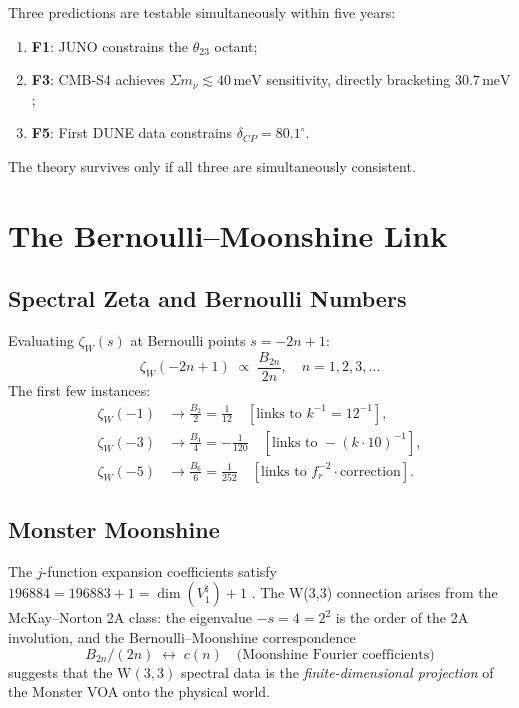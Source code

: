 \documentclass[12pt,a4paper]{article}
\newcommand{\W}{\mathrm{W}(3,3)}
\newcommand{\fr}{f_{\!r}}
\newcommand{\zetaW}{\zeta_{\!W}}
\newcommand{\sumnu}{\Sigma m_\nu}
\newcommand{\thetaTT}{\theta_{23}}
\newcommand{\deltaCP}{\delta_{\!CP}}
\begin{document}
Three predictions are testable simultaneously within five years:
\begin{enumerate}
  \item \textbf{F1}: JUNO constrains the $\thetaTT$ octant;
  \item \textbf{F3}: CMB-S4 achieves $\sumnu\lesssim 40\,\mathrm{meV}$
        sensitivity, directly bracketing $30.7\,\mathrm{meV}$;
  \item \textbf{F5}: First DUNE data constrains $\deltaCP = 80.1^\circ$.
\end{enumerate}
The theory survives only if all three are simultaneously consistent.

\section{The Bernoulli--Moonshine Link}
\label{sec:moonshine}

\subsection{Spectral Zeta and Bernoulli Numbers}

Evaluating $\zetaW(s)$ at Bernoulli points $s = -2n+1$:
\[
  \zetaW(-2n+1) \;\propto\; \frac{B_{2n}}{2n}, \quad n = 1,2,3,\ldots
\]
The first few instances:
\begin{align}
  \zetaW(-1) &\to \tfrac{B_2}{2} = \tfrac{1}{12} \quad
    [\text{links to } k^{-1} = 12^{-1}], \\
  \zetaW(-3) &\to \tfrac{B_4}{4} = -\tfrac{1}{120} \quad
    [\text{links to } -(k\cdot 10)^{-1}], \\
  \zetaW(-5) &\to \tfrac{B_6}{6} = \tfrac{1}{252} \quad
    [\text{links to } \fr^{-2}\cdot\text{correction}].
\end{align}

\subsection{Monster Moonshine}

The $j$-function expansion coefficients satisfy
$196884 = 196883 + 1 = \dim(V^\natural_1) + 1$ \cite{McKay1980,Borcherds1992}.
The W(3,3) connection arises from the McKay--Norton 2A class: the
eigenvalue $-s = 4 = 2^2$ is the order of the 2A involution, and the
Bernoulli--Moonshine correspondence
\[
  B_{2n}/(2n) \;\longleftrightarrow\; c(n)
  \quad\text{(Moonshine Fourier coefficients)}
\]
suggests that the $\W$ spectral data is the \emph{finite-dimensional
projection} of the Monster VOA onto the physical world.
\end{document}
